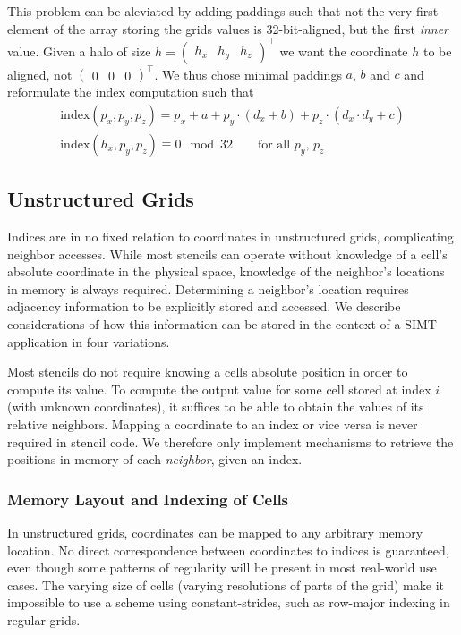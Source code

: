 This problem can be aleviated by adding paddings such that not the very first element of the array storing the grids values is 32-bit-aligned, but the first \emph{inner} value. Given a halo of size $h = \begin{pmatrix}h_x & h_y & h_z\end{pmatrix}^\top$ we want the coordinate $h$ to be aligned, not $\begin{pmatrix} 0 & 0 & 0\end{pmatrix}^\top$. We thus chose minimal paddings $a$, $b$ and $c$ and reformulate the index computation such that
\begin{gather}
	\text{index}\left(p_x, p_y, p_z\right) = p_x + a + p_y \cdot \left(d_x + b\right) + p_z \cdot \left(d_x \cdot d_y + c\right)
	\\
	\text{index}\left(h_x, p_y, p_z\right) \equiv 0 \mod 32 \qquad \text{for all $p_y$, $p_z$}
\end{gather}

\subsection{Unstructured Grids}

Indices are in no fixed relation to coordinates in unstructured grids, complicating neighbor accesses. While most stencils can operate without knowledge of a cell's absolute coordinate in the physical space, knowledge of the neighbor's locations in memory is always required. Determining a neighbor's location requires adjacency information to be explicitly stored and accessed. We describe considerations of how this information can be stored in the context of a SIMT application in four variations.

Most stencils do not require knowing a cells absolute position in order to compute its value. To compute the output value for some cell stored at index $i$ (with unknown coordinates), it suffices to be able to obtain the values of its relative neighbors. Mapping a coordinate to an index or vice versa is never required in stencil code. We therefore only implement mechanisms to retrieve the positions in memory of each \emph{neighbor}, given an index.

\subsubsection{Memory Layout and Indexing of Cells} 
\label{sec:unstructured-indexing}

In unstructured grids, coordinates can be mapped to any arbitrary memory location. No direct correspondence between coordinates to indices is guaranteed, even though some patterns of regularity will be present in most real-world use cases. The varying size of cells (varying resolutions of parts of the grid) make it impossible to use a scheme using constant-strides, such as row-major indexing in regular grids.

